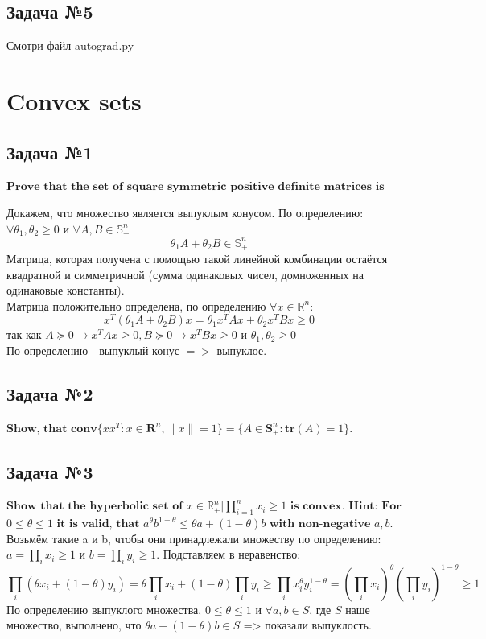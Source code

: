 \documentclass[12pt,letterpaper]{article}
\begin{document}
\subsection*{Задача №5}
Смотри файл autograd.py

\newpage
\section{Convex sets}
\subsection*{Задача №1}
${\textbf{Prove that the set of square symmetric positive definite matrices is convex.}}$

Докажем, что множество является выпуклым конусом. По определению: $ \forall \theta_1, \theta_2 \geqslant 0$ и $ \forall A, B \in \mathbb{S}_{+}^{n} $ 
$$
\theta_{1} A+\theta_{2} B \in \mathbb{S}_{+}^{n}
$$
Матрица, которая получена с помощью такой линейной комбинации остаётся квадратной и симметричной (сумма одинаковых чисел, домноженных на одинаковые константы).\\ 
Матрица положительно определена, по определению $ \forall x \in \mathbb{R}^n $:
$$x^{T}\left(\theta_{1} A+\theta_{2} B\right) x=\theta_{1} x^{T} A x+\theta_{2} x^{T} B x \geq 0$$
так как $A \succeq 0 \rightarrow x^{T} A x \geqslant 0, B \succeq 0 \rightarrow x^{T} B x \geqslant 0  \text { и } \theta_{1}, \theta_{2} \geq 0$\\
По определению - выпуклый конус $=>$ выпуклое.

\subsection*{Задача №2}
$\textbf{Show, that}$ $\textbf{conv}\{xx^T:x\in \textbf{R}^n, \parallel x\parallel =1\}=\{A\in \textbf{S}^n_+: \textbf{tr}(A)=1\}.$


\subsection*{Задача №3}
$\textbf{Show that the hyperbolic set of}$ $ {x \in \mathbb{R}^n_+ | \prod\limits_{i=1}^n x_i \geq 1 } $ $\textbf{is convex. Hint: For}$ $0 \leq \theta \leq 1$ $\textbf{it is valid, that}$ $a^\theta b^{1 - \theta} \leq \theta a + (1-\theta)b$ $\textbf{with non-negative}$ $a,b$.\\

Возьмём такие a и b, чтобы они принадлежали множеству по определению: $ a = \prod\limits_{i} x_{i} \geq 1 \text { и } b = \prod\limits_{i} y_{i} \geq 1 $.
Подставляем в неравенство: 
$$\prod\limits_{i}\left(\theta x_{i}+(1-\theta) y_{i}\right) = \theta \prod\limits_i x_i + \left( 1 - \theta \right) \prod\limits_i y_i  \geq \prod\limits_i x_{i}^{\theta} y_{i}^{1-\theta}=\left(\prod\limits_{i} x_{i}\right)^{\theta}\left(\prod\limits_{i} y_{i}\right)^{1-\theta} \geq 1$$
По определению выпуклого множества, $0 \leq \theta \leq 1$ и $ \forall a, b \in S $, где $ S $ наше множество, выполнено, что $ \theta a + (1 - \theta) b \in S $ => показали выпуклость.
\end{document}
